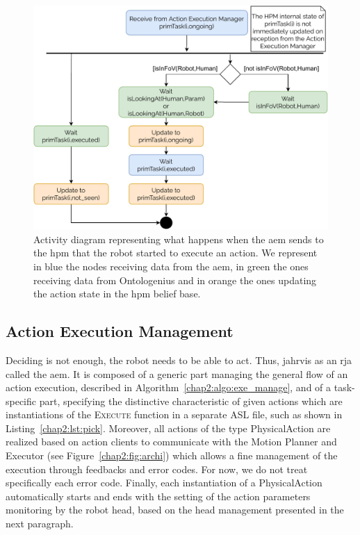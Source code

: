 \documentclass[a4paper,11pt,twoside]{StyleThese}
\begin{document}
\begin{figure}[!ht]
	\includegraphics[width=\linewidth]{figures/chapter2/robot_action_hpm.pdf}
	\caption{Activity diagram representing what happens when the \acrfull{aem} sends to the \acrshort{hpm} that the robot started to execute an action. We represent in blue the nodes receiving data from the \acrshort{aem}, in green the ones receiving data from Ontologenius and in orange the ones updating the action state in the \acrshort{hpm} belief base.}
	\label{chap2:fig:robot_action_hpm}
\end{figure}

\clearpage

\subsection{Action Execution Management}

Deciding is not enough, the robot needs to be able to act. Thus, \acrshort{jahrvis} as an \acrfull{rja} called the \acrfull{aem}. It is composed of a generic part managing the general flow of an action execution, described in Algorithm~\ref{chap2:algo:exe_manage}, and of a task-specific part, specifying the distinctive characteristic of given actions which are instantiations of the \textsc{Execute} function in a separate ASL file, such as shown in Listing~\ref{chap2:lst:pick}. Moreover, all actions of the type PhysicalAction are realized based on action clients to communicate with the Motion Planner and Executor (see Figure~\ref{chap2:fig:archi}) which allows a fine management of the execution through feedbacks and error codes. For now, we do not treat specifically each error code. Finally, each instantiation of a PhysicalAction automatically starts and ends with the setting of the action parameters monitoring by the robot head, based on the head management presented in the next paragraph.
\end{document}
